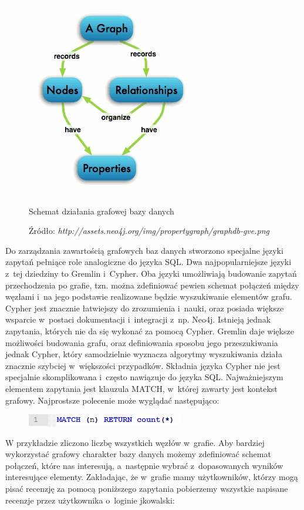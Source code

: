\begin{figure}[H]
	\centering
	\includegraphics[scale=1]{images/graphdb.png}
	\caption{Schemat działania grafowej bazy danych}
	 \caption*{\small Źródło: \emph{http://assets.neo4j.org/img/propertygraph/graphdb-gve.png}}
	\label{fig:dbschema}
\end{figure}

Do zarządzania zawartością grafowych baz danych stworzono specjalne języki zapytań pełniące role analogiczne do języka SQL.
Dwa najpopularniejsze języki z~tej dziedziny to Gremlin i~Cypher. Oba języki umożliwiają budowanie zapytań przechodzenia po grafie, tzn. można zdefiniować pewien schemat połączeń między węzłami i~na jego podstawie realizowane będzie wyszukiwanie elementów grafu. Cypher jest znacznie łatwiejszy do zrozumienia i~nauki, oraz posiada większe wsparcie w~postaci dokumentacji i~integracji z~np. Neo4j. Istnieją jednak zapytania, których nie da się wykonać za pomocą Cypher. Gremlin daje większe możliwości budowania grafu, oraz definiowania sposobu jego przeszukiwania jednak Cypher, który samodzielnie wyznacza algorytmy wyszukiwania działa znacznie szybciej w~większości przypadków. Składnia języka Cypher nie jest specjalnie skomplikowana i~często nawiązuje do języka SQL. Najważniejszym elementem zapytania jest klauzula MATCH, w~której zawarty jest kontekst grafowy. Najprostsze polecenie może wyglądać następująco:

\begin{figure}[H]
	\centering
	\includegraphics{images/cypher_q1.png}
\end{figure}

W przykładzie zliczono liczbę wszystkich węzłów w~grafie. Aby bardziej wykorzystać grafowy charakter bazy danych możemy zdefiniować schemat połączeń, które nas interesują, a~następnie wybrać z~dopasowanych wyników interesujące elementy. Zakładając, że w~grafie mamy użytkowników, którzy mogą pisać recenzję za pomocą poniższego zapytania pobierzemy wszystkie napisane recenzje przez użytkownika o~loginie jkowalski:

